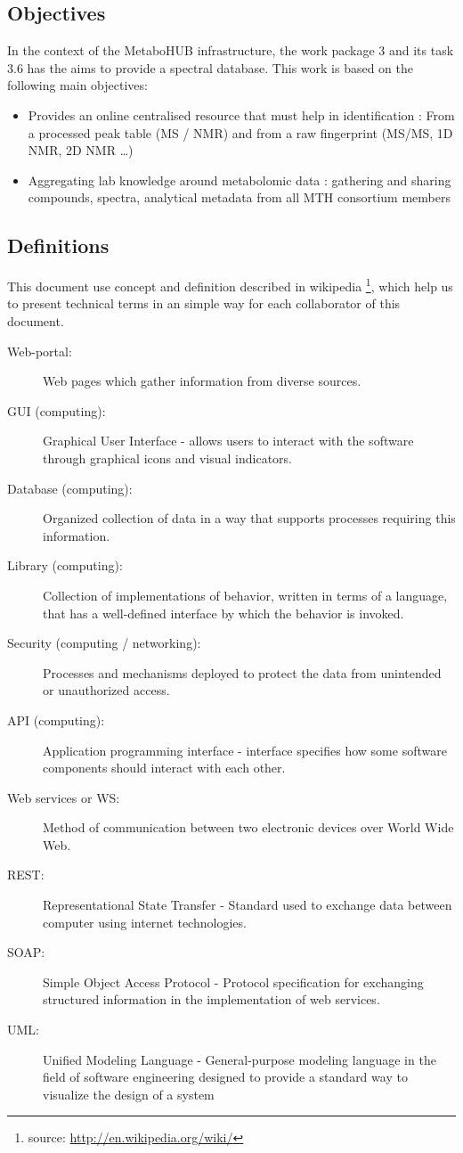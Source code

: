 \subsection{Objectives}
\hspace*{\parindent}
In the context of the MetaboHUB infrastructure, the work package 3 and its task 3.6 has the aims to provide a spectral database. This work is based on the following main objectives:
\begin{itemize}
	\item Provides an online centralised resource that must help in identification : From a processed peak table (MS / NMR) and from a raw fingerprint (MS/MS, 1D NMR, 2D NMR …)
	\item Aggregating lab knowledge around metabolomic data : gathering and sharing  compounds, spectra, analytical metadata from all MTH consortium members
\end{itemize}

\subsection{Definitions}

This document use concept and definition described in wikipedia \footnote{source: \url{http://en.wikipedia.org/wiki/}},  which help us to present technical terms in an simple way for each collaborator of this document.

\begin{description}
	\item [Web-portal:] Web pages which gather information from diverse sources.
	\item [GUI (computing):] Graphical User Interface - allows users to interact with the software through graphical icons and visual indicators.
	\item [Database (computing):] Organized collection of data in a way that supports processes requiring this information.
	\item [Library (computing):] Collection of implementations of behavior, written in terms of a language, that has a well-defined interface by which the behavior is invoked.
	\item [Security (computing / networking):] Processes and mechanisms deployed to protect the data from unintended or unauthorized access.
	\item [API (computing):] Application programming interface - interface specifies how some software components should interact with each other.
	\item [Web services or WS:] Method of communication between two electronic devices over World Wide Web.
	\item [REST:] Representational State Transfer - Standard used to exchange data between computer using internet technologies.
	\item [SOAP:] Simple Object Access Protocol - Protocol specification for exchanging structured information in the implementation of web services.
	\item [UML:] Unified Modeling Language - General-purpose modeling language in the field of software engineering designed to provide a standard way to visualize the design of a system
\end{description}


